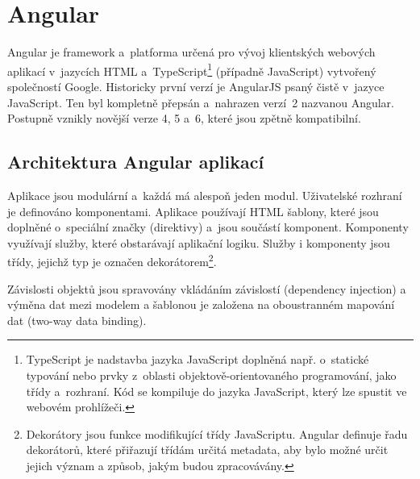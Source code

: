 \documentclass[
  digital, %
  oneside, %
  table,   %
  nolof,     %
  nolot,     %
]{fithesis3}
\begin{document}
\section{Angular}
Angular je framework a~platforma určená pro vývoj klientských webových aplikací v~jazycích HTML a~TypeScript\footnote{TypeScript je nadstavba jazyka JavaScript doplněná např. o~statické typování nebo prvky z~oblasti objektově-orientovaného programování, jako třídy a~rozhraní. Kód se kompiluje do jazyka JavaScript, který lze spustit ve webovém prohlížeči.} (případně JavaScript) vytvořený společností Google. Historicky první verzí je AngularJS psaný čistě v~jazyce JavaScript. Ten byl kompletně přepsán a~nahrazen verzí~2 nazvanou Angular. Postupně vznikly novější verze 4, 5 a~6, které jsou zpětně kompatibilní.\par

\subsection{Architektura Angular aplikací}
Aplikace jsou modulární a~každá má alespoň jeden modul. Uživatelské rozhraní je definováno komponentami. Aplikace používají HTML šablony, které jsou doplněné o~speciální značky (direktivy) a~jsou součástí komponent. Komponenty využívají služby, které obstarávají aplikační logiku. Služby i komponenty jsou třídy, jejichž typ je označen dekorátorem\footnote{Dekorátory jsou funkce modifikující třídy JavaScriptu. Angular definuje řadu dekorátorů, které přiřazují třídám určitá metadata, aby bylo možné určit jejich význam a způsob, jakým budou zpracovávány.}.\par
Závislosti objektů jsou spravovány vkládáním závislostí (dependency injection) a výměna dat mezi modelem a šablonou je založena na oboustranném mapování dat (two-way data binding). \cite{angulario}
\end{document}
